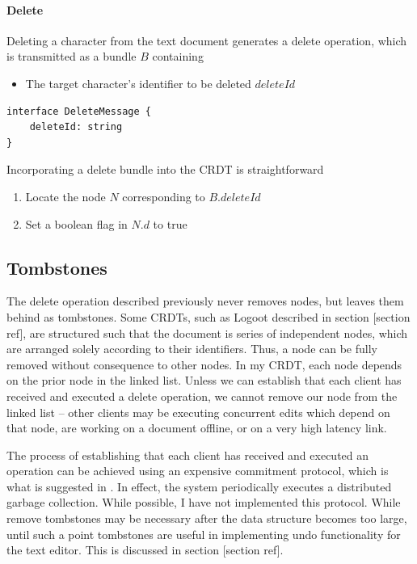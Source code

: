 \documentclass[12pt,a4paper,twoside,openright]{report}
\begin{document}
			\paragraph{Delete}
				Deleting a character from the text document generates a delete operation, which is transmitted as a bundle $B$ containing
				\begin{itemize}
					\item The target character's identifier to be deleted $deleteId$
				\end{itemize}
				
\vspace{3mm}
\begin{lstlisting}[caption=Delete Bundle Type Signature]
interface DeleteMessage {
    deleteId: string
}
\end{lstlisting}				
				
				Incorporating a delete bundle into the CRDT is straightforward
				\begin{enumerate}
					\item Locate the node $N$ corresponding to $B.deleteId$
					\item Set a boolean flag in $N.d$ to true
				\end{enumerate}
				
		\subsection{Tombstones}
			The delete operation described previously never removes nodes, but leaves them behind as tombstones. Some CRDTs, such as Logoot described in section [section ref], are structured such that the document is series of independent nodes, which are arranged solely according to their identifiers. Thus, a node can be fully removed without consequence to other nodes. In my CRDT, each node depends on the prior node in the linked list. Unless we can establish that each client has received and executed a delete operation, we cannot remove our node from the linked list -- other clients may be executing concurrent edits which depend on that node, are working on a document offline, or on a very high latency link.
			
			The process of establishing that each client has received and executed an operation can be achieved using an expensive commitment protocol, which is what is suggested in \cite{preguica2009}. In effect, the system periodically executes a distributed garbage collection. While possible, I have not implemented this protocol. While remove tombstones may be necessary after the data structure becomes too large, until such a point tombstones are useful in implementing undo functionality for the text editor. This is discussed in section [section ref].
			
\end{document}
